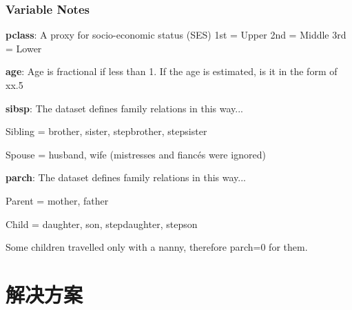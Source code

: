 \documentclass[10pt,a4paper]{ctexbook}
\begin{document}
\subsubsection{Variable Notes}
\textbf{pclass}: A proxy for socio-economic status (SES)
1st = Upper
2nd = Middle
3rd = Lower

\textbf{age}: Age is fractional if less than 1. If the age is estimated, is it in the form of xx.5

\textbf{sibsp}: The dataset defines family relations in this way...

Sibling = brother, sister, stepbrother, stepsister

Spouse = husband, wife (mistresses and fiancés were ignored)

\textbf{parch}: The dataset defines family relations in this way...

Parent = mother, father

Child = daughter, son, stepdaughter, stepson

Some children travelled only with a nanny, therefore parch=0 for them.


\section{解决方案}


\ifx\mlbook\undefined
    
\end{document}
